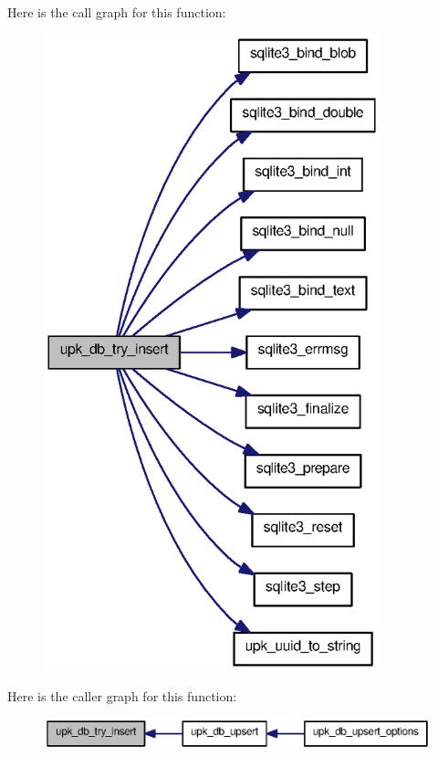 Here is the call graph for this function:
\nopagebreak
\begin{figure}[H]
\begin{center}
\leavevmode
\includegraphics[width=276pt]{group__controller_ga134b3dca14e8ce64bc851612f8411458_cgraph}
\end{center}
\end{figure}




Here is the caller graph for this function:
\nopagebreak
\begin{figure}[H]
\begin{center}
\leavevmode
\includegraphics[width=400pt]{group__controller_ga134b3dca14e8ce64bc851612f8411458_icgraph}
\end{center}
\end{figure}


